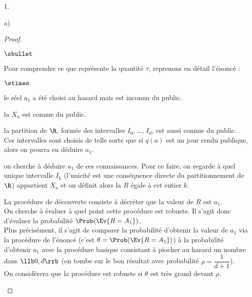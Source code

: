 \begin{noliste}{1.}
\begin{noliste}{a)}
\begin{proof}
\begin{noliste}{$\sbullet$}
      \item Pour comprendre ce que représente la quantité $\tau$,
        reprenons en détail l'énoncé :
        \begin{noliste}{$\stimes$}
        \item le réel $a_1$ a été choisi au hasard mais est inconnu du 
	public.
        \item la \var $X_a$ est connue du public.
        \item la partition de $\R$, formée des intervalles $I_0$,
          \ldots, $I_d$, est aussi connue du public.\\
          Ces intervalles sont choisis de telle sorte que si $q(a)$
          est un jour rendu publique, alors on pourra en déduire $a_1$.
        \item on cherche à déduire $a_1$ de ces connaissances. Pour ce
          faire, on regarde à quel unique intervalle $I_k$ (l'unicité
          est une conséquence directe du partitionnement de $\R$)
          appartient $X_a$ et on définit alors la \var $R$ égale à cet 
          entier $k$.
        \end{noliste}
        La procédure de découverte consiste à décréter que la valeur 
        de $R$ est $a_1$.\\
	On cherche à évaluer à quel point cette procédure est robuste.
	Il s'agit donc d'évaluer la probabilité $\Prob(\Ev{R = 
	A_1})$.\\[.2cm]
        Plus précisément, il s'agit de comparer
        la probabilité d'obtenir la valeur de $a_1$ via la procédure
        de l'énoncé (c'est $\theta = \Prob(\Ev{R = A_1})$) à la
        probabilité d'obtenir $a_1$ avec la procédure basique
        consistant à piocher au hasard un nombre dans $\llb 0, d \rrb$
        (on tombe sur le bon résultat avec probabilité $\rho =
        \dfrac{1}{d+1}$).\\
        On considèrera que la procédure est robuste si $\theta$ est
        très grand devant $\rho$.


\end{noliste}
\end{proof}
\end{noliste}
\end{noliste}
